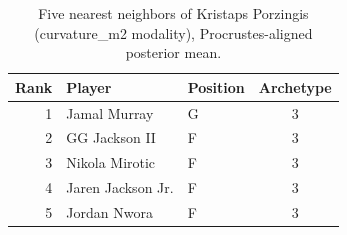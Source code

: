 \begin{table}[htbp]
  \centering\small
  \begin{tabular}{rllc}
    \toprule
    Rank & Player & Position & Archetype \\
    \midrule
    1 & Jamal Murray & G & 3 \\
    2 & GG Jackson II & F & 3 \\
    3 & Nikola Mirotic & F & 3 \\
    4 & Jaren Jackson Jr. & F & 3 \\
    5 & Jordan Nwora & F & 3 \\
    \bottomrule
  \end{tabular}
  \caption{Five nearest neighbors of Kristaps Porzingis (curvature_m2 modality), Procrustes-aligned posterior mean.}
  \label{tab:Kristaps_Porzingis_neighbors_curvature_m2}
\end{table}

